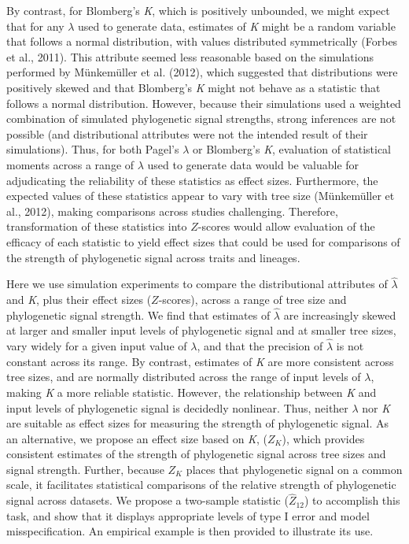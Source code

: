 \documentclass[
]{article}
\begin{document}
By contrast, for Blomberg's \emph{K}, which is positively unbounded, we
might expect that for any \(\lambda\) used to generate data, estimates
of \emph{K} might be a random variable that follows a normal
distribution, with values distributed symmetrically (Forbes et al.,
2011). This attribute seemed less reasonable based on the simulations
performed by Münkemüller et al. (2012), which suggested that
distributions were positively skewed and that Blomberg's \emph{K} might
not behave as a statistic that follows a normal distribution. However,
because their simulations used a weighted combination of simulated
phylogenetic signal strengths, strong inferences are not possible (and
distributional attributes were not the intended result of their
simulations). Thus, for both Pagel's \(\lambda\) or Blomberg's \emph{K},
evaluation of statistical moments across a range of \(\lambda\) used to
generate data would be valuable for adjudicating the reliability of
these statistics as effect sizes. Furthermore, the expected values of
these statistics appear to vary with tree size (Münkemüller et al.,
2012), making comparisons across studies challenging. Therefore,
transformation of these statistics into \(Z\)-scores would allow
evaluation of the efficacy of each statistic to yield effect sizes that
could be used for comparisons of the strength of phylogenetic signal
across traits and lineages. \hfill\break

Here we use simulation experiments to compare the distributional
attributes of \(\hat{\lambda}\) and \emph{K}, plus their effect sizes
(\(Z\)-scores), across a range of tree size and phylogenetic signal
strength. We find that estimates of \(\hat{\lambda}\) are increasingly
skewed at larger and smaller input levels of phylogenetic signal and at
smaller tree sizes, vary widely for a given input value of \(\lambda\),
and that the precision of \(\hat{\lambda}\) is not constant across its
range. By contrast, estimates of \emph{K} are more consistent across
tree sizes, and are normally distributed across the range of input
levels of \(\lambda\), making \emph{K} a more reliable statistic.
However, the relationship between \emph{K} and input levels of
phylogenetic signal is decidedly nonlinear. Thus, neither \(\lambda\)
nor \emph{K} are suitable as effect sizes for measuring the strength of
phylogenetic signal. As an alternative, we propose an effect size based
on \emph{K}, (\(Z_K\)), which provides consistent estimates of the
strength of phylogenetic signal across tree sizes and signal strength.
Further, because \(Z_K\) places that phylogenetic signal on a common
scale, it facilitates statistical comparisons of the relative strength
of phylogenetic signal across datasets. We propose a two-sample
statistic (\(\hat{Z}_{12}\)) to accomplish this task, and show that it
displays appropriate levels of type I error and model misspecification.
An empirical example is then provided to illustrate its use.
\end{document}

